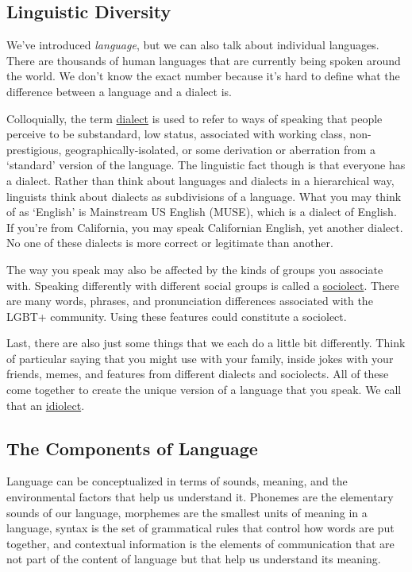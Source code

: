 \documentclass[
]{krantz}
\begin{document}
\subsection*{Linguistic Diversity}\label{linguistic-diversity}


We've introduced \emph{language}, but we can also talk about individual languages. There are thousands of human languages that are currently being spoken around the world. We don't know the exact number because it's hard to define what the difference between a language and a dialect is.

Colloquially, the term \hyperref[dialect]{dialect} is used to refer to ways of speaking that people perceive to be substandard, low status, associated with working class, non-prestigious, geographically-isolated, or some derivation or aberration from a `standard' version of the language. The linguistic fact though is that everyone has a dialect. Rather than think about languages and dialects in a hierarchical way, linguists think about dialects as subdivisions of a language. What you may think of as `English' is Mainstream US English (MUSE), which is a dialect of English. If you're from California, you may speak Californian English, yet another dialect. No one of these dialects is more correct or legitimate than another.

The way you speak may also be affected by the kinds of groups you associate with. Speaking differently with different social groups is called a \hyperref[sociolect]{sociolect}. There are many words, phrases, and pronunciation differences associated with the LGBT+ community. Using these features could constitute a sociolect.

Last, there are also just some things that we each do a little bit differently. Think of particular saying that you might use with your family, inside jokes with your friends, memes, and features from different dialects and sociolects. All of these come together to create the unique version of a language that you speak. We call that an \hyperref[idiolect]{idiolect}.

\subsection*{The Components of Language}\label{the-components-of-language}


Language can be conceptualized in terms of sounds, meaning, and the environmental factors that help us understand it. Phonemes are the elementary sounds of our language, morphemes are the smallest units of meaning in a language, syntax is the set of grammatical rules that control how words are put together, and contextual information is the elements of communication that are not part of the content of language but that help us understand its meaning.
\end{document}
